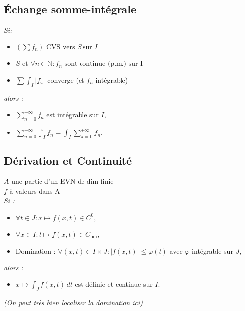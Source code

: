 \documentclass[a4paper,12pt]{report}
\newcommand{\Thm}[2]{\begin{tcolorbox}[colback=white,colframe=Red!60, title=Théorème : #1]#2\end{tcolorbox}}
\def\N{\mathbb{N}}
\begin{document}
\subsection{Échange somme-intégrale}
\Thm{Intégration terme à terme (Dernière hyp. négligeable si $(f_n)$ positive) }{
\textit{Si:}
\begin{itemize}
  \item[] \( (\sum f_n) \text{ CVS vers } S \ \underline{\text{sur } I}\)
  \item[] \( S \text{ et } \forall n \in \N : f_n \text{ sont continue (p.m.) sur I}\)
  \item[] \( \sum \int_I |f_n| \) converge (et $f_n$ intégrable)
 \end{itemize}
\textit{alors :}
\begin{itemize}
    \item[] \( \sum_{n=0}^{+\infty} f_n \) est intégrable sur \( I \),
    \item[] \( \sum_{n=0}^{+\infty} \int_I f_n = \int_I \sum_{n=0}^{+\infty} f_n \).
\end{itemize}
}

\subsection{Dérivation et Continuité}

\Thm{Continuité sous l'intégrale}{
$A$ une partie d'un EVN de dim finie\\
$f$ à valeurs dans A\\
\textit{Si :}
\begin{itemize}
    \item[] \( \forall t \in J : x \mapsto f(x,t) \in C^0 \),
    \item[] \( \forall x \in I: t \mapsto f(x,t) \in C_{\text{pm}} \),
    \item[] Domination : \( \forall (x,t) \in I \times J : |f(x,t)| \leq \varphi(t) \) avec \( \varphi \) intégrable sur \( J \),
\end{itemize}
\textit{alors :}
\begin{itemize}
    \item[] \( x \mapsto \int_J f(x,t)\,dt \) est définie et continue sur \( I \).
\end{itemize}
\textit{(On peut très bien localiser la domination ici)}
}
\end{document}
